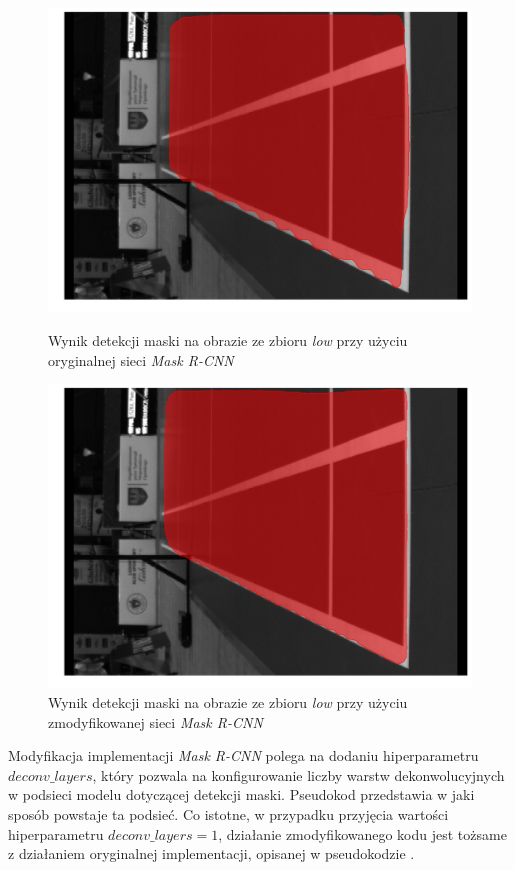 \begin{figure}[!htb]
    \includegraphics[width=\linewidth]{./original_result_frame_45.jpg}
    \caption{Wynik detekcji maski na obrazie ze zbioru \textit{low} przy użyciu oryginalnej sieci \textit{Mask R-CNN}}
    \label{fig:falbanki_original}
  \endminipage\hfill
    \includegraphics[width=\linewidth]{./56_result_frame_45.jpg}
    \caption{Wynik detekcji maski na obrazie ze zbioru \textit{low} przy użyciu zmodyfikowanej sieci \textit{Mask R-CNN}}
    \label{fig:falbanki_56}
  \endminipage\hfill
\end{figure}

Modyfikacja implementacji \textit{Mask R-CNN} polega na dodaniu hiperparametru $deconv\_layers$, który pozwala na konfigurowanie liczby warstw dekonwolucyjnych w podsieci modelu dotyczącej detekcji maski.
Pseudokod  przedstawia w jaki sposób powstaje ta podsieć. Co istotne, w przypadku przyjęcia wartości hiperparametru $deconv\_layers = 1$, działanie zmodyfikowanego kodu jest tożsame z działaniem oryginalnej implementacji, opisanej w pseudokodzie .

